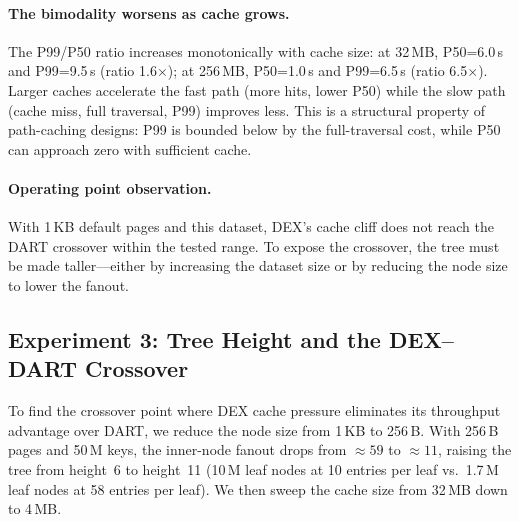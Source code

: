 \documentclass[sigconf, nonacm]{acmart}
\begin{document}
\paragraph{The bimodality worsens as cache grows.}
The P99/P50 ratio increases monotonically with cache size: at 32\,MB, P50=6.0\,\textmu s and P99=9.5\,\textmu s (ratio 1.6$\times$); at 256\,MB, P50=1.0\,\textmu s and P99=6.5\,\textmu s (ratio 6.5$\times$). Larger caches accelerate the fast path (more hits, lower P50) while the slow path (cache miss, full traversal, P99) improves less. This is a structural property of path-caching designs: P99 is bounded below by the full-traversal cost, while P50 can approach zero with sufficient cache.

\paragraph{Operating point observation.}
With 1\,KB default pages and this dataset, DEX's cache cliff does not reach the DART crossover within the tested range. To expose the crossover, the tree must be made taller---either by increasing the dataset size or by reducing the node size to lower the fanout.

\subsection{Experiment 3: Tree Height and the DEX--DART Crossover}
\label{sec:crossover}

To find the crossover point where DEX cache pressure eliminates its throughput advantage over DART, we reduce the node size from 1\,KB to 256\,B. With 256\,B pages and 50\,M keys, the inner-node fanout drops from ${\approx}59$ to ${\approx}11$, raising the tree from height~6 to height~11 (10\,M leaf nodes at 10 entries per leaf vs.\ 1.7\,M leaf nodes at 58 entries per leaf). We then sweep the cache size from 32\,MB down to 4\,MB.
\end{document}
